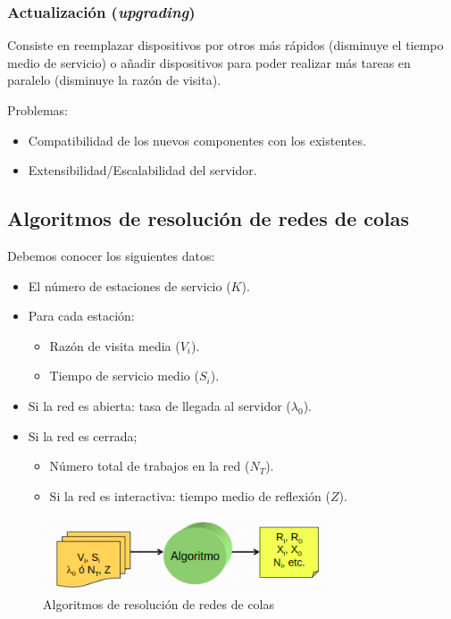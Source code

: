 \documentclass[12pt,spanish]{article}
\begin{document}
\subsubsection{Actualización (\textit{upgrading})}

Consiste en reemplazar dispositivos por otros más rápidos (disminuye el tiempo medio de servicio) o añadir dispositivos para poder realizar más tareas en paralelo (disminuye la razón de visita).

Problemas:
\begin{itemize}
	\item Compatibilidad de los nuevos componentes con los existentes.
	\item Extensibilidad/Escalabilidad del servidor.
\end{itemize}



\subsection{Algoritmos de resolución de redes de colas}

Debemos conocer los siguientes datos:
\begin{itemize}
	\item El número de estaciones de servicio ($K$).
	\item Para cada estación:
		\begin{itemize}
			\item Razón de visita media ($V_i$).
			\item Tiempo de servicio medio ($S_i$).
		\end{itemize}
	\item Si la red es abierta: tasa de llegada al servidor ($\lambda_0$).
	\item Si la red es cerrada;
		\begin{itemize}
			\item Número total de trabajos en la red ($N_T$).
			\item Si la red es interactiva: tiempo medio de reflexión ($Z$).
		\end{itemize}
\end{itemize}

\begin{figure}[H]
	\centering
	\includegraphics[width=0.75\textwidth]{algoritmos.png}
	\caption{Algoritmos de resolución de redes de colas}
\end{figure}
\end{document}
